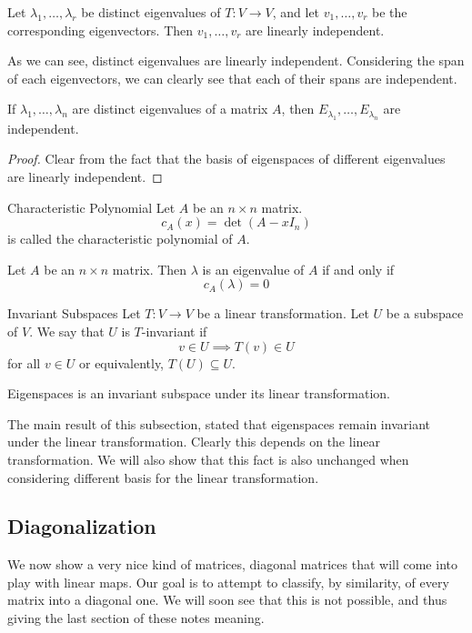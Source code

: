 \documentclass[a4paper]{article}
\begin{document}
\begin{prp}{}{} Let $\lambda_1,\dots,\lambda_r$ be distinct eigenvalues of $T:V\to V$, and let $v_1,\dots,v_r$ be the corresponding eigenvectors. Then $v_1,\dots,v_r$ are linearly independent. 
\end{prp}

As we can see, distinct eigenvalues are linearly independent. Considering the span of each eigenvectors, we can clearly see that each of their spans are independent. 

\begin{prp}{}{} If $\lambda_1,\dots,\lambda_n$ are distinct eigenvalues of a matrix $A$, then $E_{\lambda_1},\dots,E_{\lambda_n}$ are independent. 
\begin{proof}
Clear from the fact that the basis of eigenspaces of different eigenvalues are linearly independent. 
\end{proof}
\end{prp}

\begin{defn}{Characteristic Polynomial}{} Let $A$ be an $n\times n$ matrix. $$c_A(x)=\det(A-xI_n)$$ is called the characteristic polynomial of $A$. 
\end{defn}

\begin{prp}{}{} Let $A$ be an $n\times n$ matrix. Then $\lambda$ is an eigenvalue of $A$ if and only if $$c_A(\lambda)=0$$
\end{prp}

\begin{defn}{Invariant Subspaces}{} Let $T:V\to V$ be a linear transformation. Let $U$ be a subspace of $V$. We say that $U$ is $T$-invariant if $$v\in U\implies T(v)\in U$$ for all $v\in U$ or equivalently, $T(U)\subseteq U$. 
\end{defn}

\begin{thm}{}{} Eigenspaces is an invariant subspace under its linear transformation. 
\end{thm}

The main result of this subsection, stated that eigenspaces remain invariant under the linear transformation. Clearly this depends on the linear transformation. We will also show that this fact is also unchanged when considering different basis for the linear transformation. 

\subsection{Diagonalization}
We now show a very nice kind of matrices, diagonal matrices that will come into play with linear maps. Our goal is to attempt to classify, by similarity, of every matrix into a diagonal one. We will soon see that this is not possible, and thus giving the last section of these notes meaning. 
\end{document}
